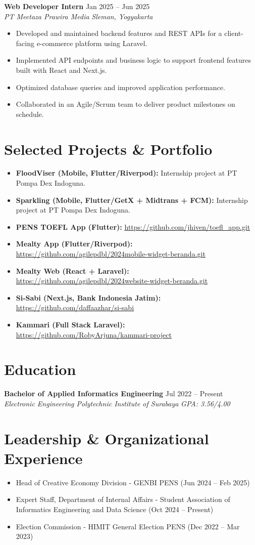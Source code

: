 \documentclass[11pt,a4paper]{article}
\newcommand{\resumeEntry}[4]{%
  {\textbf{\color{primary}#1}} \hfill #2\\
  {\textit{\color{accent}#3}} \hfill {\textit{\color{accent}#4}}
}
\newcommand{\cvgpa}{3.56/4.00}
\newcommand{\cvuniversity}{Electronic Engineering Polytechnic Institute of Surabaya}
\begin{document}
\resumeEntry{Web Developer Intern}{Jan 2025 -- Jun 2025}{PT Meetaza Prawira Media}{Sleman, Yogyakarta}
\begin{itemize}
    \item Developed and maintained backend features and REST APIs for a client-facing e-commerce platform using Laravel.
    \item Implemented API endpoints and business logic to support frontend features built with React and Next.js.
    \item Optimized database queries and improved application performance.
    \item Collaborated in an Agile/Scrum team to deliver product milestones on schedule.
\end{itemize}

\section*{Selected Projects \& Portfolio}
\begin{itemize}
    \item \textbf{FloodViser (Mobile, Flutter/Riverpod):} Internship project at PT Pompa Dex Indoguna.
    \item \textbf{Sparkling (Mobile, Flutter/GetX + Midtrans + FCM):} Internship project at PT Pompa Dex Indoguna.
    \item \textbf{PENS TOEFL App (Flutter):} \url{https://github.com/jhiven/toefl_app.git}
    \item \textbf{Mealty App (Flutter/Riverpod):} \url{https://github.com/agilepdbl/2024mobile-widget-beranda.git}
    \item \textbf{Mealty Web (React + Laravel):} \url{https://github.com/agilepdbl/2024website-widget-beranda.git}
    \item \textbf{Si-Sabi (Next.js, Bank Indonesia Jatim):} \url{https://github.com/daffaazhar/si-sabi}
    \item \textbf{Kammari (Full Stack Laravel):} \url{https://github.com/RobyArjuna/kammari-project}
\end{itemize}

\section*{Education}
\resumeEntry{Bachelor of Applied Informatics Engineering}{Jul 2022 -- Present}{\cvuniversity}{GPA: \cvgpa}

\section*{Leadership \& Organizational Experience}
\begin{itemize}
    \item Head of Creative Economy Division - GENBI PENS (Jun 2024 -- Feb 2025)
    \item Expert Staff, Department of Internal Affairs - Student Association of Informatics Engineering and Data Science (Oct 2024 -- Present)
    \item Election Commission - HIMIT General Election PENS (Dec 2022 -- Mar 2023)
\end{itemize}
\end{document}
